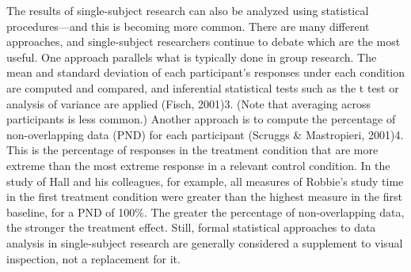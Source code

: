  The results of single-subject research can also be analyzed using statistical procedures---and this is becoming more common. There are many different approaches, and single-subject researchers continue to debate which are the most useful. One approach parallels what is typically done in group research. The mean and standard deviation of each participant's responses under each condition are computed and compared, and inferential statistical tests such as the t test or analysis of variance are applied (Fisch, 2001)3. (Note that averaging across participants is less common.) Another approach is to compute the percentage of non-overlapping data (PND) for each participant (Scruggs \& Mastropieri, 2001)4. This is the percentage of responses in the treatment condition that are more extreme than the most extreme response in a relevant control condition. In the study of Hall and his colleagues, for example, all measures of Robbie's study time in the first treatment condition were greater than the highest measure in the first baseline, for a PND of 100\%. The greater the percentage of non-overlapping data, the stronger the treatment effect. Still, formal statistical approaches to data analysis in single-subject research are generally considered a supplement to visual inspection, not a replacement for it.
 
 
\subsection{}
 
